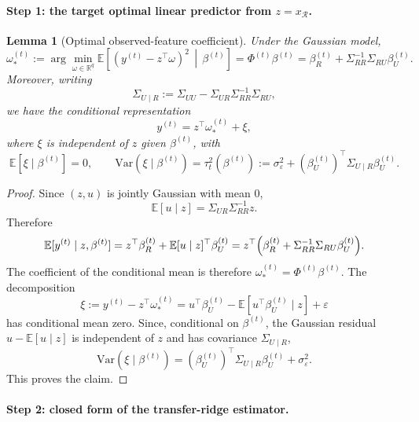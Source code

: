 \documentclass[11pt]{article}
\newcommand{\1}{\mathbf{1}}
\newtheorem{lemma}{Lemma}
\begin{document}
\bigskip

\paragraph{Step 1: the target optimal linear predictor from \(z=x_{\mathcal R}\).}

\begin{lemma}[Optimal observed-feature coefficient]
Under the Gaussian model,
\[
\omega_*^{(t)}:=\arg\min_{\omega\in\mathbb R^q}
\mathbb E\!\left[(y^{(t)}-z^\top\omega)^2\,\middle|\,\beta^{(t)}\right]
=
\Phi^{(t)}\beta^{(t)}
=
\beta_R^{(t)}+\Sigma_{RR}^{-1}\Sigma_{RU}\beta_U^{(t)}.
\]
Moreover, writing
\[
\Sigma_{U\mid R}:=\Sigma_{UU}-\Sigma_{UR}\Sigma_{RR}^{-1}\Sigma_{RU},
\]
we have the conditional representation
\[
y^{(t)}=z^\top\omega_*^{(t)}+\xi,
\]
where \(\xi\) is independent of \(z\) given \(\beta^{(t)}\), with
\[
\mathbb E[\xi\mid \beta^{(t)}]=0,
\qquad
\mathrm{Var}(\xi\mid \beta^{(t)})
=
\tau_t^2(\beta^{(t)})
:=
\sigma_\varepsilon^2+(\beta_U^{(t)})^\top\Sigma_{U\mid R}\beta_U^{(t)}.
\]
\end{lemma}

\begin{proof}
Since \((z,u)\) is jointly Gaussian with mean \(0\),
\[
\mathbb E[u\mid z]=\Sigma_{UR}\Sigma_{RR}^{-1}z.
\]
Therefore
\[
\mathbb E[y^{(t)}\mid z,\beta^{(t)}]
=
z^\top\beta_R^{(t)}+\mathbb E[u\mid z]^\top\beta_U^{(t)}
=
z^\top\Bigl(\beta_R^{(t)}+\Sigma_{RR}^{-1}\Sigma_{RU}\beta_U^{(t)}\Bigr).
\]
The coefficient of the conditional mean is therefore \(\omega_*^{(t)}=\Phi^{(t)}\beta^{(t)}\). The decomposition
\[
\xi:=y^{(t)}-z^\top\omega_*^{(t)}
=
u^\top\beta_U^{(t)}-\mathbb E[u^\top\beta_U^{(t)}\mid z]+\varepsilon
\]
has conditional mean zero. Since, conditional on \(\beta^{(t)}\), the Gaussian residual \(u-\mathbb E[u\mid z]\) is independent of \(z\) and has covariance \(\Sigma_{U\mid R}\),
\[
\mathrm{Var}(\xi\mid \beta^{(t)})
=
(\beta_U^{(t)})^\top\Sigma_{U\mid R}\beta_U^{(t)}+\sigma_\varepsilon^2.
\]
This proves the claim.
\end{proof}

\bigskip

\paragraph{Step 2: closed form of the transfer-ridge estimator.}
\end{document}
